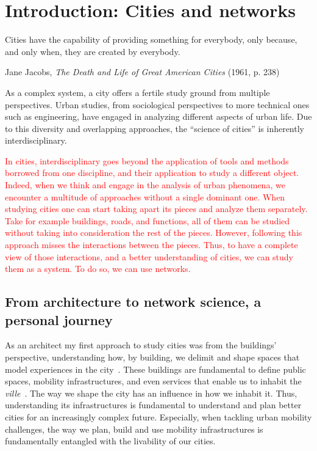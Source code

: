 \chapter{Introduction: Cities and networks}

\epigraph{Cities have the capability of providing something for everybody, only because, and only when, they are created by everybody.}{Jane Jacobs, \textit{The Death and Life of Great American Cities} (1961, p. 238)}

As a complex system, a city offers a fertile study ground from multiple perspectives. Urban studies, from sociological perspectives to more technical ones such as engineering, have engaged in analyzing different aspects of urban life. Due to this diversity and overlapping approaches, the ``science of cities'' is inherently interdisciplinary.

\textcolor{red}{In cities, interdisciplinary goes beyond the application of tools and methods borrowed from one discipline, and their application to study a different object. Indeed, when we think and engage in the analysis of urban phenomena, we encounter a multitude of approaches without a single dominant one. When studying cities one can start taking apart its pieces and analyze them separately. Take for example buildings, roads, and functions, all of them can be studied without taking into consideration the rest of the pieces. However, following this approach misses the interactions between the pieces. Thus, to have a complete view of those interactions, and a better understanding of cities, we can study them as a system. To do so, we can use networks.}

\section{From architecture to network science, a personal journey}

As an architect my first approach to study cities was from the buildings' perspective, understanding how, by building, we delimit and shape spaces that model experiences in the city~\cite{gehl1971life}. These buildings are fundamental to define public spaces, mobility infrastructures, and even services that enable us to inhabit the \textit{ville}~\cite{sennett2018building}. The way we shape the city has an influence in how we inhabit it. Thus, understanding its infrastructures is fundamental to understand and plan better cities for an increasingly complex future. Especially, when tackling urban mobility challenges, the way we plan, build and use mobility infrastructures is fundamentally entangled with the livability of our cities.

